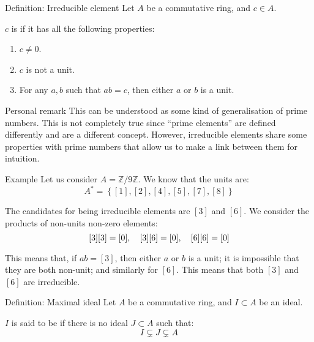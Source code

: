 \documentclass[a4paper]{article}
\begin{document}
\begin{parag}{Definition: Irreducible element}
    Let $A$ be a commutative ring, and $c \in A$.

    $c$ is  if it has all the following properties:
    \begin{enumerate}
        \item $c \neq 0$.
        \item $c$ is not a unit.
        \item For any $a, b$ such that $ab = c$, then either $a$ or $b$ is a unit.
    \end{enumerate}

    \begin{subparag}{Personal remark}
        This can be understood as some kind of generalisation of prime numbers. This is not completely true since ``prime elements'' are defined differently and are a different concept. However, irreducible elements share some properties with prime numbers that allow us to make a link between them for intuition.
    \end{subparag}
\end{parag}

\begin{parag}{Example}
    Let us consider $A =\mathbb{Z}/9\mathbb{Z}$. We know that the units are: 
    \[A^* = \left\{\left[1\right], \left[2\right], \left[4\right], \left[5\right], \left[7\right], \left[8\right]\right\}\]
    
    The candidates for being irreducible elements are $\left[3\right]$ and $\left[6\right]$. We consider the products of non-units non-zero elements:
    \[\left[3\right]\left[3\right] = \left[0\right], \mathspace \left[3\right]\left[6\right] = \left[0\right], \mathspace \left[6\right]\left[6\right] = \left[0\right]\]
    
    This means that, if $ab = \left[3\right]$, then either $a$ or $b$ is a unit; it is impossible that they are both non-unit; and similarly for $\left[6\right]$. This means that both $\left[3\right]$ and $\left[6\right]$ are irreducible.
\end{parag}

\begin{parag}{Definition: Maximal ideal}
    Let $A$ be a commutative ring, and $I \subset A$ be an ideal.

    $I$ is said to be  if there is no ideal $J \subset A$ such that: 
    \[I \subsetneq J \subsetneq A\]
\end{parag}
\end{document}
